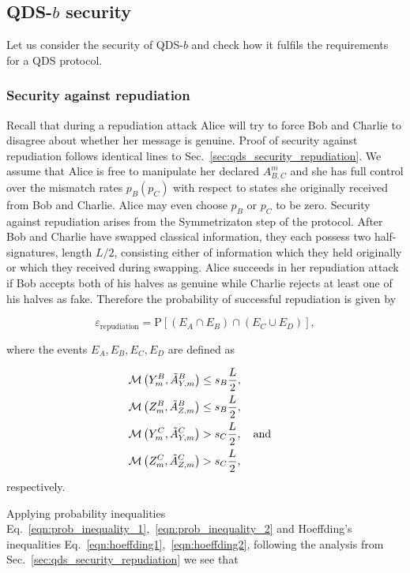 \subsection{QDS-$b$ security}
Let us consider the security of QDS-$b$ and check how it fulfils the requirements for a QDS protocol. 

\subsubsection{Security against repudiation}
Recall that during a repudiation attack Alice will try to force Bob and Charlie to disagree about whether her message is genuine. Proof of security against repudiation follows identical lines to Sec.~\ref{sec:qds_security_repudiation}. We assume that Alice is free to manipulate her declared $A_{B, C}^m$ and she has full control over the mismatch rates $p_B \left(p_C\right)$ with respect to states she originally received from Bob and Charlie. Alice may even choose $p_B$ or $p_C$ to be zero. Security against repudiation arises from the Symmetrizaton step of the protocol. After Bob and Charlie have swapped classical information, they each possess two half-signatures, length $L/2$, consisting either of information which they held originally or which they received during swapping. Alice succeeds in her repudiation attack if Bob accepts both of his halves as genuine while Charlie rejects at least one of his halves as fake. Therefore the probability of successful repudiation is given by

\begin{equation}
\varepsilon_{\text{repudiation}} = \text{P}\left[\left(E_A \cap E_B\right) \cap \left(E_C \cup E_D\right) \right],
\end{equation}

\noindent where the events $E_A, E_B, E_C, E_D$ are defined as

\begin{align}
&\mathcal{M}\left(Y_m^B, \tilde{A}_{Y, m}^B\right) \le s_B \frac{L}{2}, \notag \\
%
&\mathcal{M}\left(Z_m^B, \tilde{A}_{Z, m}^B\right) \le s_B \frac{L}{2}, \notag \\
%
&\mathcal{M}\left(Y_m^C, \tilde{A}_{Y, m}^C\right) > s_C \frac{L}{2}, \qq{and}\notag \\
%
&\mathcal{M}\left(Z_m^C, \tilde{A}_{Z, m}^C\right) > s_C \frac{L}{2},
\end{align}
respectively.

Applying probability inequalities Eq.~\ref{eqn:prob_inequality_1},~\ref{eqn:prob_inequality_2} and Hoeffding's inequalities Eq.~\ref{eqn:hoeffding1},~\ref{eqn:hoeffding2}, following the analysis from Sec.~\ref{sec:qds_security_repudiation} we see that


